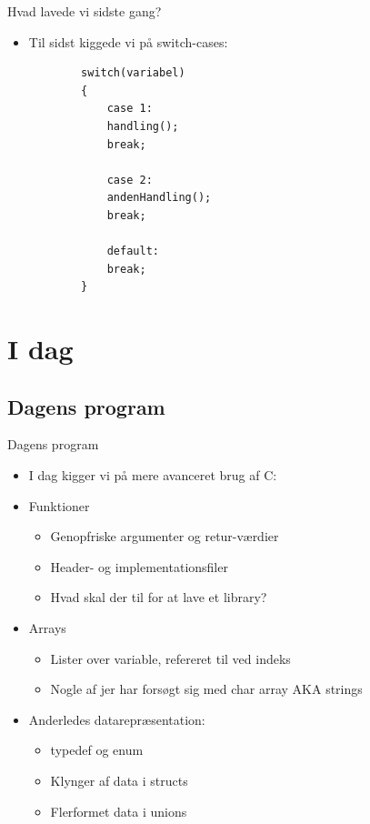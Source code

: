 \documentclass{beamer}
\begin{document}

\begin{frame}[fragile]{Hvad lavede vi sidste gang?}
	\begin{itemize}
		\item{Til sidst kiggede vi på {\color{C_darkblue}switch}-cases:}
		\begin{lstlisting}
		switch(variabel)
		{
			case 1:
			handling();
			break;

			case 2:
			andenHandling();
			break;

			default:
			break;
		}
		\end{lstlisting}
	\end{itemize}
\end{frame}

\section{I dag}
\subsection{Dagens program}

\begin{frame}[fragile]{Dagens program}
	\begin{itemize}
		\item{I dag kigger vi på mere avanceret brug af C:}
		\item{Funktioner}
		\begin{itemize}
			\item{Genopfriske argumenter og retur-værdier}
			\item{Header- og implementationsfiler}
			\item{Hvad skal der til for at lave et library?}
		\end{itemize}
		\item{Arrays}
		\begin{itemize}
			\item{Lister over variable, refereret til ved indeks}
			\item{Nogle af jer har forsøgt sig med char array AKA strings}
		\end{itemize}
		\item{Anderledes datarepræsentation:}
		\begin{itemize}
			\item{{\color{C_darkblue}typedef} og {\color{C_darkblue}enum}}
			\item{Klynger af data i {\color{C_darkblue}structs}}
			\item{Flerformet data i {\color{C_darkblue}unions}}
		\end{itemize}
	\end{itemize}
\end{frame}
\end{document}
